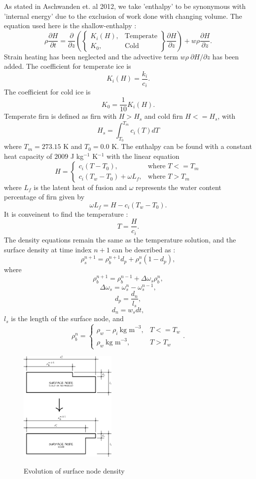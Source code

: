 \documentclass{article}%
\begin{document}
As stated in Aschwanden et. al 2012, we take 'enthalpy' to be synonymous with 'internal energy' due to the exclusion of work done with changing volume.  The equation used here is the shallow-enthalpy :
	$$
  \rho \frac{\partial H}{\partial t} = \frac{\partial}{\partial z} 
    \left( 
      \begin{Bmatrix}
        K_i(H), &\text{Temperate}\\
        K_0, &\text{Cold}
      \end{Bmatrix}
      \frac{\partial H}{\partial z} 
    \right) + w \rho \frac{\partial H}{\partial z}.
  $$
Strain heating has been neglected and the advective term $w \rho\ \partial H / \partial z$ has been added.  The coefficient for temperate ice is 
  $$K_i(H) = \frac{k_i}{c_i}.$$
The coefficient for cold ice is
  $$K_0 = \frac{1}{10}K_i(H).$$
Temperate firn is defined as firn with $H > H_s$ and cold firn $H <= H_s$, with
  $$H_s = \int_{T_0}^{T_m}{c_i(T)}dT$$ 
where $T_m = 273.15$ K and $T_0 = 0.0$ K.  The enthalpy can be found with a constant heat capacity of $2009$ J kg$^{-1}$ K$^{-1}$ with the linear equation
  $$
  H = 
  \begin{cases}
    c_i(T - T_0), &\text{where } T <= T_m\\
    c_i(T_w - T_0) + \omega L_f,  &\text{where } T > T_m
  \end{cases}
  $$
where $L_f$ is the latent heat of fusion and $\omega$ represents the water content percentage of firn given by
  $$\omega L_f = H - c_i(T_w - T_0).$$
It is conveinent to find the temperature :
  $$T = \frac{H}{c_i}.$$
The density equations remain the same as the temperature solution, and the surface density at time index $n+1$ can be described as : 
  $$\rho_s^{n+1} = \rho_b^{n+1} d_p + \rho_s^{n} (1 - d_p),$$
where
  $$\rho_b^{n+1} = \rho_b^{n-1} + \Delta \omega_s \rho_b^n,$$
  $$\Delta \omega_s = \omega_s^{n} - \omega_s^{n-1},$$ 
  $$d_p = \frac{d_n}{l_s},$$
  $$d_n = w_sdt,$$
$l_s$ is the length of the surface node, and
  $$
  \rho_b^n = 
  \begin{cases}
    \rho_w - \rho_i\ \text{kg m}^{-3},  &T <= T_w\\
    \rho_w\ \text{kg m}^{-3}, &T > T_w
  \end{cases}.
  $$
\begin{figure}[H]
	\centering
		\includegraphics[width=0.42\textwidth]{images/surfaceDensity.png}
	\label{fig:500 year orbit}
	\caption{Evolution of surface node density}
\end{figure}
\end{document}
